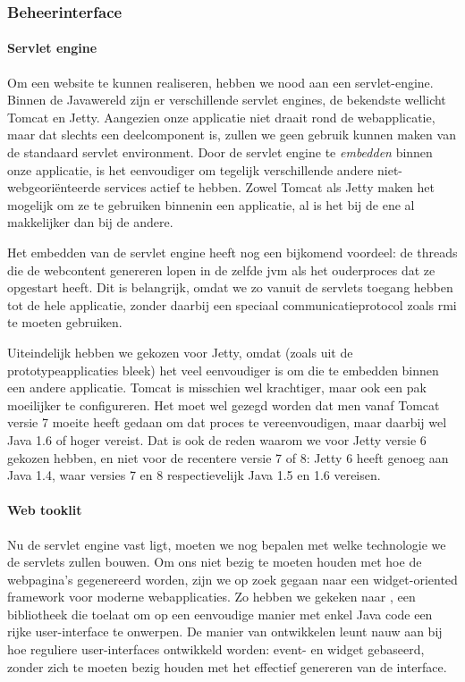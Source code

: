 \subsubsection{Beheerinterface}

\paragraph{Servlet engine} Om een website te kunnen realiseren, hebben we nood aan een servlet-engine. Binnen de Javawereld zijn er verschillende servlet engines, de bekendste wellicht Tomcat en Jetty. Aangezien onze applicatie niet draait rond de webapplicatie, maar dat slechts een deelcomponent is, zullen we geen gebruik kunnen maken van de standaard servlet environment. Door de servlet engine te \emph{embedden} binnen onze applicatie, is het eenvoudiger om tegelijk verschillende andere niet-webgeoriënteerde services actief te hebben. Zowel Tomcat als Jetty maken het mogelijk om ze te gebruiken binnenin een applicatie, al is het bij de ene al makkelijker dan bij de andere.

Het embedden van de servlet engine heeft nog een bijkomend voordeel: de threads die de webcontent genereren lopen in de zelfde \ac{jvm} als het ouderproces dat ze opgestart heeft. Dit is belangrijk, omdat we zo vanuit de servlets toegang hebben tot de hele applicatie, zonder daarbij een speciaal communicatieprotocol zoals \ac{rmi} te moeten gebruiken.

Uiteindelijk hebben we gekozen voor Jetty, omdat (zoals uit de prototypeapplicaties bleek) het veel eenvoudiger is om die te embedden binnen een andere applicatie. Tomcat is misschien wel krachtiger, maar ook een pak moeilijker te configureren. Het moet wel gezegd worden dat men vanaf Tomcat versie 7 moeite heeft gedaan om dat proces te vereenvoudigen, maar daarbij wel Java 1.6 of hoger vereist. Dat is ook de reden waarom we voor Jetty versie 6 gekozen hebben, en niet voor de recentere versie 7 of 8: Jetty 6 heeft genoeg aan Java 1.4, waar versies 7 en 8 respectievelijk Java 1.5 en 1.6 vereisen.

\paragraph{Web tooklit} Nu de servlet engine vast ligt, moeten we nog bepalen met welke technologie we de servlets zullen bouwen. Om ons niet bezig te moeten houden met hoe de webpagina's gegenereerd worden, zijn we op zoek gegaan naar een widget-oriented framework voor moderne webapplicaties. Zo hebben we gekeken naar , een bibliotheek die toelaat om op een eenvoudige manier met enkel Java code een rijke user-interface te onwerpen. De manier van ontwikkelen leunt nauw aan bij hoe reguliere user-interfaces ontwikkeld worden: event- en widget gebaseerd, zonder zich te moeten bezig houden met het effectief genereren van de interface.

